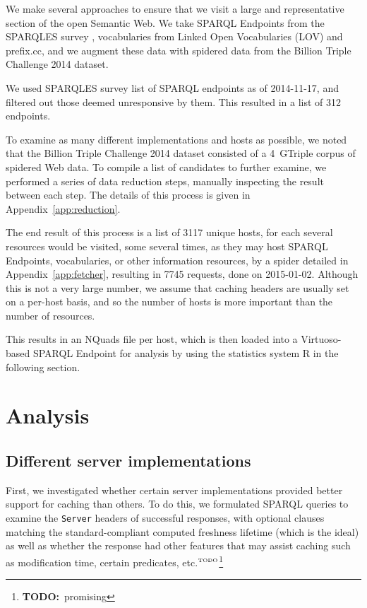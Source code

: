 \documentclass{llncs}
\newcommand{\httph}[1]{\texttt{#1}}
\newcommand{\todo}[1]{\ensuremath{^{\textrm{\tiny{TODO}\normalsize}}}\footnote{\textbf{TODO:}~#1}}
\begin{document}
We make several approaches to ensure that we visit a large and
representative section of the open Semantic Web. We take SPARQL
Endpoints from the SPARQLES survey \cite{buil2013sparql}, vocabularies
from Linked Open Vocabularies (LOV) \cite{lov2} and prefix.cc, and
we augment these data with spidered data from the Billion Triple
Challenge 2014 \cite{btc-2014} dataset.

We used SPARQLES survey list of SPARQL endpoints as of 2014-11-17, and
filtered out those deemed unresponsive by them. This resulted in a
list of 312 endpoints.

To examine as many different implementations and hosts as possible, we
noted that the Billion Triple Challenge 2014 \cite{btc-2014} dataset
consisted of a 4~GTriple corpus of spidered Web data. To compile a
list of candidates to further examine, we performed a
series of data reduction steps, manually inspecting the result between
each step. The details of this process is given in
Appendix~\ref{app:reduction}.

The end result of this process is a list of 3117 unique hosts, for
each several resources would be visited, some several times, as they
may host SPARQL Endpoints, vocabularies, or other information
resources, by a spider detailed in Appendix~\ref{app:fetcher},
resulting in 7745 requests, done on 2015-01-02. Although this is not a
very large number, we assume that caching headers are usually set on a
per-host basis, and so the number of hosts is more important than the
number of resources.

This results in an NQuads file per host, which is then loaded into a
Virtuoso-based SPARQL Endpoint for analysis by using the statistics
system R\cite{kn:r} in the following section.

\section{Analysis}

\subsection{Different server implementations}

First, we investigated whether certain server implementations provided better support
for caching than others. To do this, we formulated SPARQL queries to
examine the \httph{Server} headers of successful responses, with
optional clauses matching the standard-compliant computed freshness
lifetime (which is the ideal) as well as whether the response had other
features that may assist caching such as modification time,
certain predicates, etc.\todo{promising}
\end{document}
